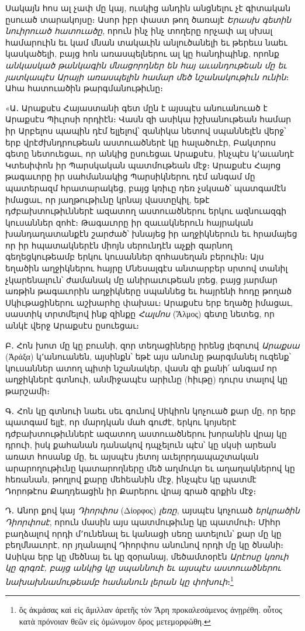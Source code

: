 \documentclass{article}
\begin{document}
{Սակայն հոս ալ չափ մը կայ, ուսկից անդին անցնելու չէ գիտական ըսուած տարակոյսը։ Ասոր իբր փաստ թող ծառայէ \emph{Երասխ գետին նուիրուած հատուածը}, որուն ինչ ինչ տողերը որչափ ալ սխալ համարուին եւ կամ մնան տակաւին անլուծանելի եւ թերեւս նաեւ կասկածելի, բայց հոն առասպելներու ալ կը հանդիպինք, որոնք \emph{անկասկած թանկագին մնացորդներ են հայ աւանդութեան մը եւ յատկապէս Արայի առասպելին համար մեծ նշանակութիւն ունին}։ Ահա հատուածին թարգմանութիւնը։

«Ա․ Արաքսէս Հայաստանի գետ մըն է այսպէս անուանուած է Արաքսէս Պիւլոսի որդիէն։ Վասն զի ասիկա իշխանութեան համար իր Արբելոս պապին դէմ ելլելով՝ զանիկա նետով սպաննելէն վերջ՝ երբ վրէժխնդրութեան աստուածներէ կը հալածուէր, Բակտրոս գետը նետուեցաւ, որ անկից ըսուեցաւ Արաքսէս, ինչպէս կ՚աւանդէ Կտեսիփոն իր Պարսկական պատմութեան մէջ։ Արաքսէս Հայոց թագաւորը իր սահմանակից Պարսիկներու դէմ անգամ մը պատերազմ հրատարակեց, բայց կռիւը դեռ չսկսած՝ պատգամէն իմացաւ, որ յաղթութիւնը կրնայ վաստըկիլ, եթէ դժբախտութիւններէ ազատող աստուածներու երկու ազնուազգի կուսաններ զոհէ։ Թագաւորը իր զաւակներուն հայրական խանդաղատանքէն շարժած՝ խնայեց իր աղջիկներուն եւ հրամայեց որ իր հպատակներէն միոյն սերունդէն աչքի զարնող գեղեցկութեամբ երկու կուսաններ զոհասեղան բերուին։ Այս եղածին աղջիկներու հայրը Մնեսալգէս անտարբեր սրտով տանիլ չկարենալուն՝ ժամանակ մը անիրաւութեան լռեց, բայց յարմար առթին թագաւորին աղջիկները սպաննեց եւ հայրենի հոդը թողած Սկիւթացիներու աշխարհը փախաւ։ Արաքսէս երբ եղածը իմացաւ, սաստիկ տրտմելով ինք զինքը \emph{Հալմոս} (Ἅλμος) գետը նետեց, որ անկէ վերջ Արաքսէս ըսուեցաւ։

Բ․ Հոն խոտ մը կը բուսնի, զոր տեղացիները իրենց լեզուով \emph{Արաքսա} (Ἀράξα) կ՚անուանեն, այսինքն՝ եթէ այս անունը թարգմանել ուզենք՝ կուսաններ ատող պիտի նշանակեր, վասն զի քանի՛ անգամ որ աղջիկներէ գտնուի, անմիջապէս արիւնը (հիւթը) դուրս տալով կը թարշամի։

Գ․ Հոն կը գտնուի նաեւ սեւ գունով Սիկիոն կոչուած քար մը, որ երբ պատգամ ելլէ, որ մարդկան մահ գուժէ, երկու կոյսերէ դժբախտութիւններէ ազատող աստուածներու խորանին վրայ կը դրուի, իսկ քահանան դանակով դպչելուն պէս՝ կը սկսի արեան առատ հոսանք մը, եւ այսպէս յետոյ աւելորդապաշտական արարողութիւնը կատարողները մեծ աղմուկո եւ աղաղակներով կը հեռանան, թողլով քարը մեհեանին մէջ, ինչպէս կը պատմէ Դորոթէոս Քաղդեացին իր Քարերու վրայ գրած գրքին մէջ։

Դ․ Անոր քով կայ \emph{Դիորփոս} (Δἰορφος) \emph{լեռը}, այսպէս կոչուած \emph{երկրածին Դիորփոսէ}, որուն մասին այս պատմութիւնը կը պատմուի։ Միհր բաղձալով որդի մ՚ունենալ եւ կանացի սեռը ատելուն՝ քար մը կը բեղմնաւորէ, որ յղանալով Դիորփոս անունով որդի մը կը ծնանի։ Ասիկա երբ կը մեծնայ եւ կը զօրանայ, մեծամտօրէն \emph{Արէոսը կռուի կը գրգռէ, բայց անկից կը սպաննուի եւ այսպէս աստուածներու նախախնամութեամբ համանուն լերան կը փոխուի}։\footnote{ὅς ἀκμἀσας καὶ εἰς ἅμιλλαν ἀρετῆς τὸν Ἄρη προκαλεσάμενος ἀνῃρέθη. οὗτος κατὰ πρόνοιαν θεῶν εἰς ὁμώνυμον ὄρος μετεμορφώθη.}

}
\end{document}
